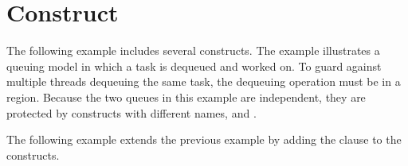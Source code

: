 \section{ Construct}
\label{sec:critical}

The following example includes several  constructs. The example 
illustrates a queuing model in which a task is dequeued and worked on. To guard 
against multiple threads dequeuing the same task, the dequeuing operation must 
be in a  region. Because the two queues in this example are independent, 
they are protected by  constructs with different names,  
and .



The following example extends the previous example by adding the  clause to the  constructs.



